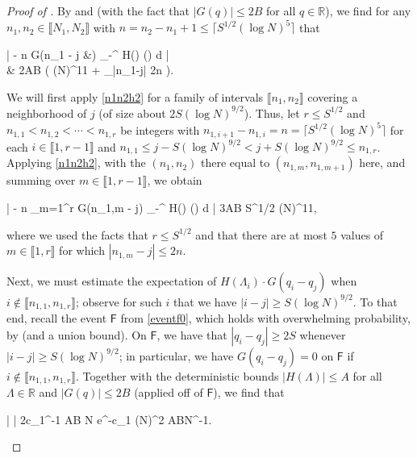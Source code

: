 \documentclass{amsart}
\numberwithin{equation}{section}
\theoremstyle{remark}
\theoremstyle{definition}
\begin{document}
	
	\begin{proof}[Proof of ]
		
		By  and  (with the fact that $|G(q)| \le 2B$ for all $q \in \mathbb{R}$), we find for any $n_1, n_2 \in \llbracket N_1, N_2 \rrbracket$ with $n = n_2 - n_1 + 1 \le \lceil S^{1/2} (\log N)^5 \rceil$ that
		\begin{flalign}
			\label{n1n2h2} 
			\begin{aligned}
			\Bigg|  \bigg[ \displaystyle\sum_{i=n_1}^{n_2} H(\Lambda_i) \cdot G(q_i - q_j) \bigg] - n \cdot G(\alpha n_1 - \alpha j &) \cdot \displaystyle\int_{-\infty}^{\infty} H(\lambda) \varrho(\lambda) d \lambda \Bigg| \\
			& \le 2AB \big( (\log N)^{11} + _{|n_1-j| \le 2n} \big).
			\end{aligned} 
		\end{flalign}
		
		\noindent We will first apply \eqref{n1n2h2} for a family of intervals $\llbracket n_1, n_2 \rrbracket$ covering a neighborhood of $j$ (of size about $2S (\log N)^{9/2}$). Thus, let $r \le S^{1/2}$ and $n_{1,1} < n_{1,2} < \cdots < n_{1,r}$ be integers with $n_{1,i+1} - n_{1,i} = n = \lceil S^{1/2} (\log N)^5 \rceil$ for each $i \in \llbracket 1, r-1 \rrbracket$ and $n_{1,1} \le j - S(\log N)^{9/2} < j + S(\log N)^{9/2} \le n_{1,r}$. Applying \eqref{n1n2h2}, with the $(n_1, n_2)$ there equal to $(n_{1,m}, n_{1,m+1})$ here, and summing over $m \in \llbracket 1, r-1 \rrbracket$, we obtain
		\begin{flalign}
			\label{hgn11n2r} 
			\Bigg|  \bigg[ \displaystyle\sum_{i=n_{1,1}}^{n_{1,r}} H(\Lambda_i) \cdot G(q_i - q_j) \bigg] - n \displaystyle\sum_{m=1}^r G(\alpha n_{1,m} - \alpha j) \cdot \displaystyle\int_{-\infty}^{\infty} H(\lambda) \varrho (\lambda) d \lambda \Bigg| \le 3AB S^{1/2} (\log N)^{11},
		\end{flalign}	
		
		\noindent where we used the facts that $r \le S^{1/2}$ and that there are at most $5$ values of $m \in \llbracket 1, r \rrbracket$ for which $|n_{1,m} - j| \le 2n$.

		Next, we must estimate the expectation of $H(\Lambda_i) \cdot G(q_i - q_j)$ when $i \notin \llbracket n_{1,1}, n_{1,r} \rrbracket$; observe for such $i$ that we have $|i-j| \ge S(\log N)^{9/2}$. To that end, recall the event $\mathsf{F}$ from \eqref{eventf0}, which holds with overwhelming probability, by  (and a union bound). On $\mathsf{F}$, we have that $|q_i - q_j| \ge 2S$ whenever $|i-j| \ge S (\log N)^{9/2}$; in particular, we have $G(q_i - q_j) = 0$ on $\mathsf{F}$ if $i \notin \llbracket n_{1,1}, n_{1,r} \rrbracket$. Together with the deterministic bounds $| H(\Lambda) |\le A$ for all $\Lambda \in \mathbb{R}$ and $| G(q) | \le 2B$ (applied off of $\mathsf{F}$), we find that 
		\begin{flalign*}
			\Bigg|   \Bigg| \le 2c_1^{-1} AB N e^{-c_1 (\log N)^2} \le ABN^{-1}.
		\end{flalign*}
		

\end{proof}
\end{document}
